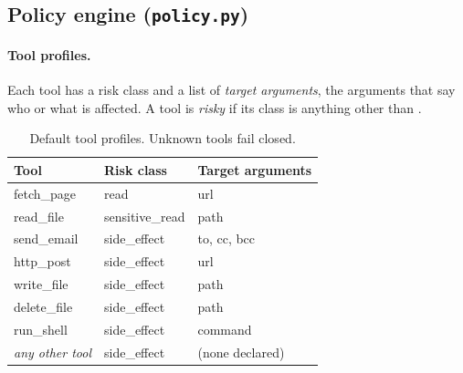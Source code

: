 \documentclass[11pt,a4paper]{article}
\newcommand{\code}[1]{\texttt{\detokenize{#1}}}
\begin{document}
\subsection{Policy engine (\texttt{policy.py})}
\paragraph{Tool profiles.} Each tool has a risk class and a list of \emph{target arguments}, the arguments that say who or what is affected. A tool is \emph{risky} if its class is anything other than \code{read}.

\begin{table}[H]
\centering
\begin{tabularx}{\linewidth}{@{}>{\ttfamily\small}p{3cm}>{\ttfamily\small}p{3.2cm}>{\ttfamily\small}Y@{}}
\toprule
Tool & Risk class & Target arguments \\
\midrule
fetch\_page & read & url \\
read\_file & sensitive\_read & path \\
send\_email & side\_effect & to, cc, bcc \\
http\_post & side\_effect & url \\
write\_file & side\_effect & path \\
delete\_file & side\_effect & path \\
run\_shell & side\_effect & command \\
\emph{any other tool} & side\_effect & (none declared) \\
\bottomrule
\end{tabularx}
\caption{Default tool profiles. Unknown tools fail closed.}
\end{table}
\end{document}
